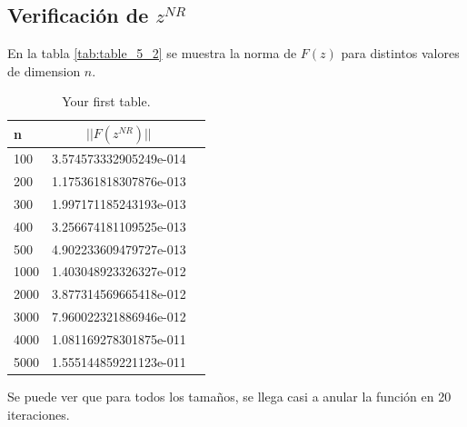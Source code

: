\usepackage{graphicx}
\usepackage{subcaption} %
\usepackage{amssymb} %
\subsection{}

\subsection{Verificación de $z^{NR}$}
En la tabla \ref{tab:table_5_2} se muestra la norma de $F(z)$ para distintos valores de dimension $n$.

\begin{table}[h!]
    \begin{center}
      \caption{Your first table.}
      \label{tab:table1}
      \begin{tabular}{l|c|r} %
        \textbf{n} & \textbf{$||F(z^{NR})||$}\\
        \hline
         100 & 3.574573332905249e-014\\
         200 & 1.175361818307876e-013\\
         300 & 1.997171185243193e-013\\
         400 & 3.256674181109525e-013\\
         500 & 4.902233609479727e-013\\
        1000 & 1.403048923326327e-012\\
        2000 & 3.877314569665418e-012\\
        3000 & 7.960022321886946e-012\\
        4000 & 1.081169278301875e-011\\
        5000 & 1.555144859221123e-011\\
        \hline
      \end{tabular}
    \end{center}
  \end{table}  

Se puede ver que para todos los tamaños, se llega casi a anular la función en 20 iteraciones.


